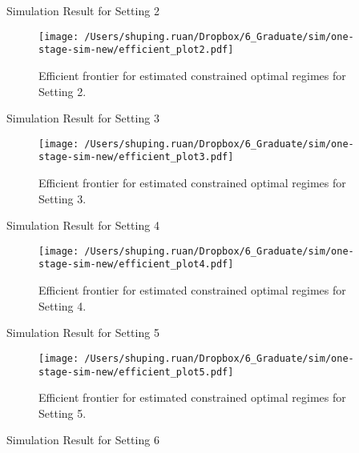 \documentclass[12pt]{article}
\begin{document}
\begin{table}[!htbp]
	\centering
	{\tt
		
	}
	\caption {Simulation Result for Setting 2}
\end{table} 
\begin{figure}[!htb]
	\centering
	\texttt{[image: /Users/shuping.ruan/Dropbox/6\_Graduate/sim/one-stage-sim-new/efficient\_plot2.pdf]}
	\caption{Efficient frontier for estimated constrained optimal regimes for Setting 2.}
	\label{fig:2}
\end{figure}
\begin{table}[!htbp]
	\centering
	{\tt
		
	}
	\caption {Simulation Result for Setting 3}
\end{table} 
\begin{figure}[!htb]
	\centering
	\texttt{[image: /Users/shuping.ruan/Dropbox/6\_Graduate/sim/one-stage-sim-new/efficient\_plot3.pdf]}
	\caption{Efficient frontier for estimated constrained optimal regimes for Setting 3.}
	\label{fig:3}
\end{figure}
\begin{table}[!htbp]
	\centering
	{\tt
		
	}
	\caption {Simulation Result for Setting 4}
\end{table} 
\begin{figure}[!htb]
	\centering
	\texttt{[image: /Users/shuping.ruan/Dropbox/6\_Graduate/sim/one-stage-sim-new/efficient\_plot4.pdf]}
	\caption{Efficient frontier for estimated constrained optimal regimes for Setting 4.}
	\label{fig:4}
\end{figure}
\begin{table}[!htbp]
	\centering
	{\tt
		
	}
	\caption {Simulation Result for Setting 5}
\end{table} 
\begin{figure}[!htb]
	\centering
	\texttt{[image: /Users/shuping.ruan/Dropbox/6\_Graduate/sim/one-stage-sim-new/efficient\_plot5.pdf]}
	\caption{Efficient frontier for estimated constrained optimal regimes for Setting 5.}
	\label{fig:5}
\end{figure}
\begin{table}[!htbp]
	\centering
	{\tt
		
	}
	\caption {Simulation Result for Setting 6}
\end{table} 
\end{document}
